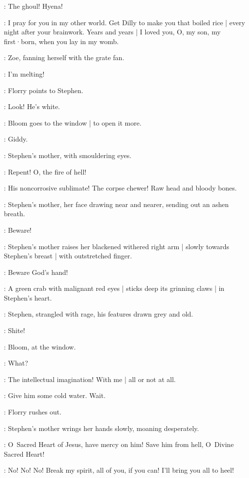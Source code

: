 \Stephen:
The ghoul!
%
Hyena!

\Mother:
I pray for you in my other world.
Get Dilly to make you that boiled rice |
every night after your brainwork.
Years and years |
I loved you,
O,
my son,
my first·born,
when you lay in my womb.

:
Zoe,
fanning herself with the grate fan.

\Zoe:
I'm melting!

:
Florry points to Stephen.

\Florry:
Look!
He's white.

:
Bloom goes to the window |
to open it more.

\Bloom:
Giddy.

:
Stephen's mother,
with smouldering eyes.

\Mother:
Repent!
O,
the fire of hell!

\Stephen:
His noncorrosive sublimate!
The corpse chewer!
Raw head and bloody bones.

:
Stephen's mother,
her face drawing near and nearer,
sending out an ashen breath.

\Mother:
Beware!

:
Stephen's mother raises her blackened withered right arm |
slowly towards Stephen's breast |
with outstretched finger.

\Mother:
Beware God's hand!

:
A green crab with malignant red eyes |
%
sticks deep its grinning claws |
in Stephen's heart.

:
Stephen,
strangled with rage,
his features drawn grey and old.

\Stephen:
Shite!

:
Bloom,
at the window.

\Bloom:
What?

\Stephen:
The intellectual imagination!
With me |
all or not at all.

\Florry:
Give him some cold water.
Wait.

:
Florry rushes out.

:
Stephen's mother wrings her hands slowly,
moaning desperately.

\Mother:
O~Sacred Heart of Jesus,
have mercy on him!
Save him from hell,
O~Divine Sacred Heart!

\Stephen:
No!
No!
No!
Break my spirit,
all of you,
if you can!
I'll bring you all to heel!

